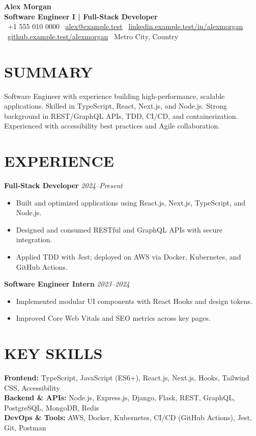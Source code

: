 \documentclass[a4paper,11pt]{article}
\begin{document}
\begin{center}
    {\Huge \textbf{Alex Morgan}}\\[5pt]
    {\large\textbf{Software Engineer I | Full-Stack Developer}}\\[9pt]
    \normalsize
    \textbullet\ +1 555 010 0000 \textbullet\ \href{mailto:alex@example.test}{alex@example.test} \textbullet\ \href{https://linkedin.example.test/in/alexmorgan}{linkedin.example.test/in/alexmorgan} \textbullet\ \href{https://github.example.test/alexmorgan}{github.example.test/alexmorgan} \textbullet\ Metro City, Country
\end{center}
\section*{SUMMARY}
Software Engineer with experience building high-performance, scalable applications. Skilled in TypeScript, React, Next.js, and Node.js. Strong background in REST/GraphQL APIs, TDD, CI/CD, and containerization. Experienced with accessibility best practices and Agile collaboration.
\section*{EXPERIENCE}
\textbf{Full-Stack Developer} \hfill \textit{2024–Present}
\begin{itemize}
    \item Built and optimized applications using React.js, Next.js, TypeScript, and Node.js.
    \item Designed and consumed RESTful and GraphQL APIs with secure integration.
    \item Applied TDD with Jest; deployed on AWS via Docker, Kubernetes, and GitHub Actions.
\end{itemize}
\vspace{5pt}
\textbf{Software Engineer Intern} \hfill \textit{2023–2024}
\begin{itemize}
    \item Implemented modular UI components with React Hooks and design tokens.
    \item Improved Core Web Vitals and SEO metrics across key pages.
\end{itemize}

\section*{KEY SKILLS}
\noindent
\textbf{Frontend:} TypeScript, JavaScript (ES6+), React.js, Next.js, Hooks, Tailwind CSS, Accessibility \\[5pt]
\textbf{Backend \& APIs:} Node.js, Express.js, Django, Flask, REST, GraphQL, PostgreSQL, MongoDB, Redis \\[5pt]
\textbf{DevOps \& Tools:} AWS, Docker, Kubernetes, CI/CD (GitHub Actions), Jest, Git, Postman
\end{document}
